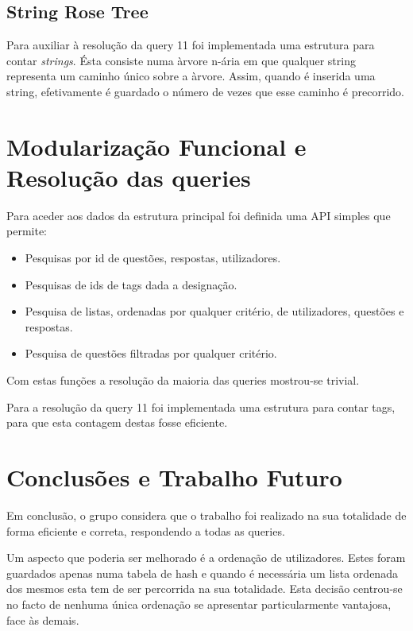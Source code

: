 \documentclass[10pt,a4paper]{article}
\begin{document}
    \subsection{String Rose Tree}
    Para auxiliar à resolução da query 11 foi implementada uma estrutura para
    contar \textit{strings}. Ésta consiste numa àrvore n-ária em que qualquer
    string representa um caminho único sobre a àrvore. Assim, quando é inserida
    uma string, efetivamente é guardado o número de vezes que esse caminho é
    precorrido.

\section{Modularização Funcional e Resolução das queries}
    Para aceder aos dados da estrutura principal foi definida uma API
    simples que permite:
    \begin{itemize}
        \item Pesquisas por id de questões, respostas, utilizadores.
        \item Pesquisas de ids de tags dada a designação.
        \item Pesquisa de listas, ordenadas por qualquer critério, de
              utilizadores, questões e respostas.
        \item Pesquisa de questões filtradas por qualquer critério.
    \end{itemize}

    Com estas funções a resolução da maioria das queries mostrou-se
    trivial.

    Para a resolução da query 11 foi implementada uma estrutura para contar tags,
    para que esta contagem destas fosse eficiente.

\section{Conclusões e Trabalho Futuro}
    Em conclusão, o grupo considera que o trabalho foi realizado na sua
    totalidade de forma eficiente e correta, respondendo a todas as queries.

    Um aspecto que poderia ser melhorado é a ordenação de utilizadores. Estes
    foram guardados apenas numa tabela de hash e quando é necessária um lista
    ordenada dos mesmos esta tem de ser percorrida na sua totalidade. Esta
    decisão centrou-se no facto de nenhuma única ordenação se apresentar
    particularmente vantajosa, face às demais.
\end{document}
